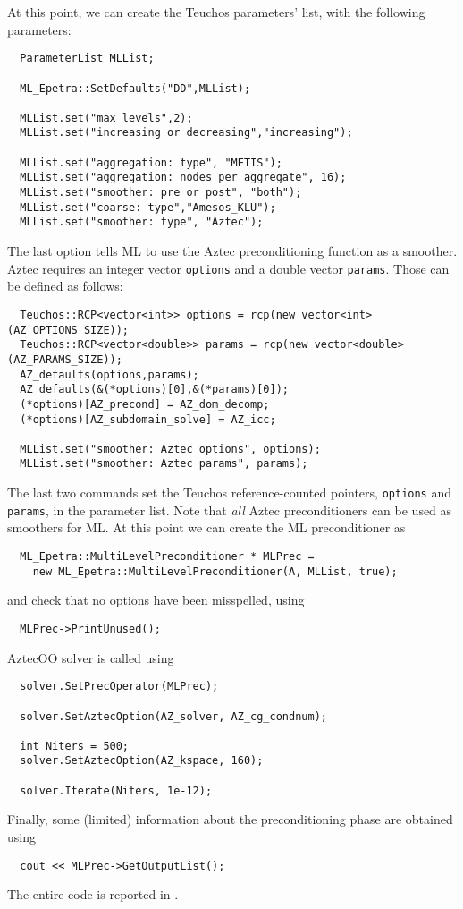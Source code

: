 At this point, we can create the Teuchos parameters' list, with the
following parameters:
\begin{verbatim}
  ParameterList MLList;

  ML_Epetra::SetDefaults("DD",MLList);

  MLList.set("max levels",2);
  MLList.set("increasing or decreasing","increasing");

  MLList.set("aggregation: type", "METIS");
  MLList.set("aggregation: nodes per aggregate", 16);
  MLList.set("smoother: pre or post", "both");
  MLList.set("coarse: type","Amesos_KLU");
  MLList.set("smoother: type", "Aztec");
\end{verbatim}
The last option tells ML to use the Aztec preconditioning function as a
smoother. Aztec requires an integer vector \verb!options! and a double
vector \verb!params!. Those can be defined as follows:
\begin{verbatim}
  Teuchos::RCP<vector<int>> options = rcp(new vector<int>(AZ_OPTIONS_SIZE));
  Teuchos::RCP<vector<double>> params = rcp(new vector<double>(AZ_PARAMS_SIZE));
  AZ_defaults(options,params);
  AZ_defaults(&(*options)[0],&(*params)[0]);
  (*options)[AZ_precond] = AZ_dom_decomp;
  (*options)[AZ_subdomain_solve] = AZ_icc;

  MLList.set("smoother: Aztec options", options);
  MLList.set("smoother: Aztec params", params);
\end{verbatim}
The last two commands set the Teuchos reference-counted pointers,
{\tt options} and {\tt params}, in the parameter list.
Note that {\sl all} Aztec preconditioners can be used as smoothers for
ML. 
At this point we can create the ML preconditioner as
\begin{verbatim}
  ML_Epetra::MultiLevelPreconditioner * MLPrec =
    new ML_Epetra::MultiLevelPreconditioner(A, MLList, true);
\end{verbatim}
and check that no options have been misspelled, using
\begin{verbatim}
  MLPrec->PrintUnused();
\end{verbatim}
AztecOO solver is called using
\begin{verbatim}
  solver.SetPrecOperator(MLPrec);

  solver.SetAztecOption(AZ_solver, AZ_cg_condnum);

  int Niters = 500;
  solver.SetAztecOption(AZ_kspace, 160);

  solver.Iterate(Niters, 1e-12);
\end{verbatim}
Finally, some (limited) information about the preconditioning phase are
obtained using
\begin{verbatim}
  cout << MLPrec->GetOutputList();
\end{verbatim}
The entire code is reported in 
\newline
{}.
\newline
